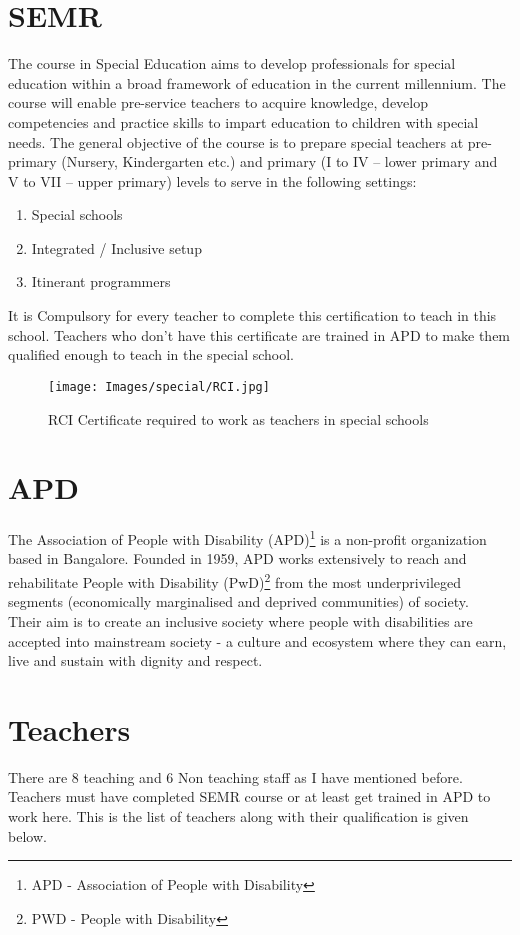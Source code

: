 \section{SEMR}
The course in Special Education aims to develop professionals for special education within a broad framework of education in the current millennium. The course will enable pre-service teachers to acquire knowledge, develop competencies and practice skills to impart education to children with special needs. The general objective of the course is to prepare special teachers at pre-primary (Nursery, Kindergarten etc.) and primary (I to IV – lower primary and V to VII – upper primary) levels to serve in the following settings:
\begin{enumerate}
    \item Special schools
    \item Integrated / Inclusive setup
    \item Itinerant programmers
\end{enumerate}

It is Compulsory for every teacher to complete this certification to teach in this school. Teachers who don't have this certificate are trained in APD to make them qualified enough to teach in the special school.

\begin{figure}[H]
    \centering
    \texttt{[image: Images/special/RCI.jpg]}
    \caption*{RCI Certificate required to work as teachers in special schools}
\end{figure}

\section{APD}
The Association of People with Disability (APD)\footnote{APD - Association of People with Disability} is a non-profit organization based in Bangalore. Founded in 1959, APD works extensively to reach and rehabilitate People with Disability (PwD)\footnote{PWD - People with Disability} from the most underprivileged segments (economically marginalised and deprived communities) of society. \\

Their aim is to create an inclusive society where people with disabilities are accepted into mainstream society - a culture and ecosystem where they can earn, live and sustain with dignity and respect.
\section{Teachers}
There are 8 teaching and 6 Non teaching staff as I have mentioned before. Teachers must have completed SEMR course or at least get trained in APD to work here. This is the list of teachers along with their qualification is given below.


